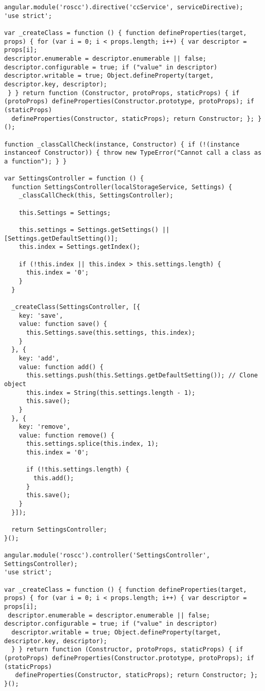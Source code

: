 \begin{lstlisting}[breaklines=true,basicstyle=\tiny]
angular.module('roscc').directive('ccService', serviceDirective);
'use strict';

var _createClass = function () { function defineProperties(target, props) { for (var i = 0; i < props.length; i++) { var descriptor = props[i]; 
descriptor.enumerable = descriptor.enumerable || false; descriptor.configurable = true; if ("value" in descriptor) 
descriptor.writable = true; Object.defineProperty(target, descriptor.key, descriptor);
 } } return function (Constructor, protoProps, staticProps) { if (protoProps) defineProperties(Constructor.prototype, protoProps); if (staticProps)
  defineProperties(Constructor, staticProps); return Constructor; }; }();

function _classCallCheck(instance, Constructor) { if (!(instance instanceof Constructor)) { throw new TypeError("Cannot call a class as a function"); } }

var SettingsController = function () {
  function SettingsController(localStorageService, Settings) {
    _classCallCheck(this, SettingsController);

    this.Settings = Settings;

    this.settings = Settings.getSettings() || [Settings.getDefaultSetting()];
    this.index = Settings.getIndex();

    if (!this.index || this.index > this.settings.length) {
      this.index = '0';
    }
  }

  _createClass(SettingsController, [{
    key: 'save',
    value: function save() {
      this.Settings.save(this.settings, this.index);
    }
  }, {
    key: 'add',
    value: function add() {
      this.settings.push(this.Settings.getDefaultSetting()); // Clone object
      this.index = String(this.settings.length - 1);
      this.save();
    }
  }, {
    key: 'remove',
    value: function remove() {
      this.settings.splice(this.index, 1);
      this.index = '0';

      if (!this.settings.length) {
        this.add();
      }
      this.save();
    }
  }]);

  return SettingsController;
}();

angular.module('roscc').controller('SettingsController', SettingsController);
'use strict';

var _createClass = function () { function defineProperties(target, props) { for (var i = 0; i < props.length; i++) { var descriptor = props[i];
 descriptor.enumerable = descriptor.enumerable || false; descriptor.configurable = true; if ("value" in descriptor)
  descriptor.writable = true; Object.defineProperty(target, descriptor.key, descriptor);
  } } return function (Constructor, protoProps, staticProps) { if (protoProps) defineProperties(Constructor.prototype, protoProps); if (staticProps)
   defineProperties(Constructor, staticProps); return Constructor; }; }();


\end{lstlisting}
